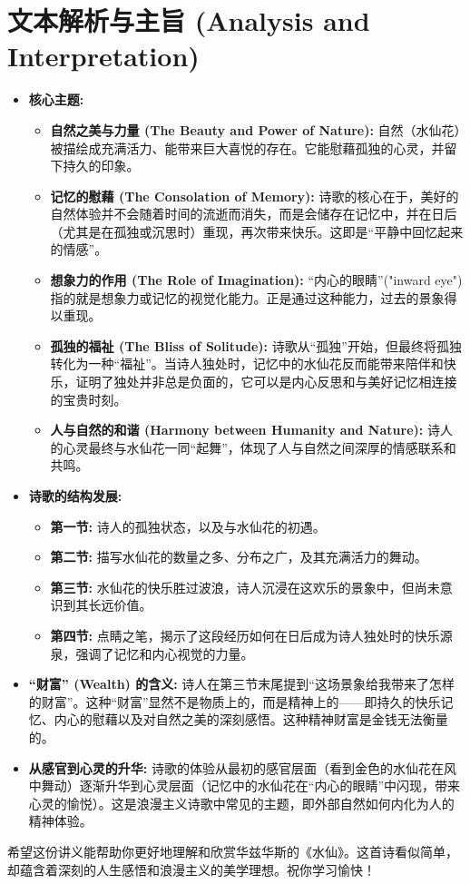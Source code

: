 \documentclass[12pt, a4paper]{article}
\begin{document}
\section{文本解析与主旨 (Analysis and Interpretation)}

\begin{itemize}
    \item \textbf{核心主题:}
        \begin{itemize}
            \item \textbf{自然之美与力量 (The Beauty and Power of Nature):} 自然（水仙花）被描绘成充满活力、能带来巨大喜悦的存在。它能慰藉孤独的心灵，并留下持久的印象。
            \item \textbf{记忆的慰藉 (The Consolation of Memory):} 诗歌的核心在于，美好的自然体验并不会随着时间的流逝而消失，而是会储存在记忆中，并在日后（尤其是在孤独或沉思时）重现，再次带来快乐。这即是“平静中回忆起来的情感”。
            \item \textbf{想象力的作用 (The Role of Imagination):} “内心的眼睛”("inward eye") 指的就是想象力或记忆的视觉化能力。正是通过这种能力，过去的景象得以重现。
            \item \textbf{孤独的福祉 (The Bliss of Solitude):} 诗歌从“孤独”开始，但最终将孤独转化为一种“福祉”。当诗人独处时，记忆中的水仙花反而能带来陪伴和快乐，证明了独处并非总是负面的，它可以是内心反思和与美好记忆相连接的宝贵时刻。
            \item \textbf{人与自然的和谐 (Harmony between Humanity and Nature):} 诗人的心灵最终与水仙花一同“起舞”，体现了人与自然之间深厚的情感联系和共鸣。
        \end{itemize}
    \item \textbf{诗歌的结构发展:}
        \begin{itemize}
            \item \textbf{第一节:} 诗人的孤独状态，以及与水仙花的初遇。
            \item \textbf{第二节:} 描写水仙花的数量之多、分布之广，及其充满活力的舞动。
            \item \textbf{第三节:} 水仙花的快乐胜过波浪，诗人沉浸在这欢乐的景象中，但尚未意识到其长远价值。
            \item \textbf{第四节:} 点睛之笔，揭示了这段经历如何在日后成为诗人独处时的快乐源泉，强调了记忆和内心视觉的力量。
        \end{itemize}
    \item \textbf{“财富” (Wealth) 的含义:} 诗人在第三节末尾提到“这场景象给我带来了怎样的财富”。这种“财富”显然不是物质上的，而是精神上的——即持久的快乐记忆、内心的慰藉以及对自然之美的深刻感悟。这种精神财富是金钱无法衡量的。
    \item \textbf{从感官到心灵的升华:} 诗歌的体验从最初的感官层面（看到金色的水仙花在风中舞动）逐渐升华到心灵层面（记忆中的水仙花在“内心的眼睛”中闪现，带来心灵的愉悦）。这是浪漫主义诗歌中常见的主题，即外部自然如何内化为人的精神体验。
\end{itemize}


希望这份讲义能帮助你更好地理解和欣赏华兹华斯的《水仙》。这首诗看似简单，却蕴含着深刻的人生感悟和浪漫主义的美学理想。祝你学习愉快！
\end{document}
